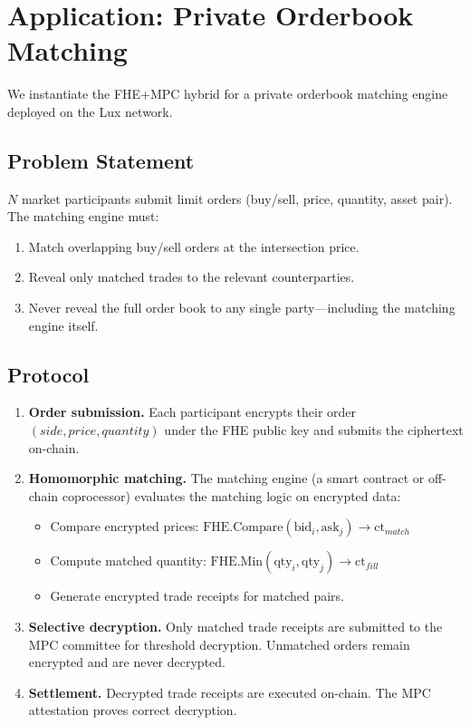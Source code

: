 \section{Application: Private Orderbook Matching}


We instantiate the FHE+MPC hybrid for a private orderbook matching engine deployed on the Lux network.

\subsection{Problem Statement}

$N$ market participants submit limit orders (buy/sell, price, quantity, asset pair). The matching engine must:
\begin{enumerate}[leftmargin=2em]
\item Match overlapping buy/sell orders at the intersection price.
\item Reveal only matched trades to the relevant counterparties.
\item Never reveal the full order book to any single party---including the matching engine itself.
\end{enumerate}

\subsection{Protocol}

\begin{enumerate}[leftmargin=2em]
\item \textbf{Order submission.} Each participant encrypts their order $(side, price, quantity)$ under the FHE public key and submits the ciphertext on-chain.
\item \textbf{Homomorphic matching.} The matching engine (a smart contract or off-chain coprocessor) evaluates the matching logic on encrypted data:
    \begin{itemize}
    \item Compare encrypted prices: $\text{FHE.Compare}(\text{bid}_i, \text{ask}_j) \to \text{ct}_{match}$
    \item Compute matched quantity: $\text{FHE.Min}(\text{qty}_i, \text{qty}_j) \to \text{ct}_{fill}$
    \item Generate encrypted trade receipts for matched pairs.
    \end{itemize}
\item \textbf{Selective decryption.} Only matched trade receipts are submitted to the MPC committee for threshold decryption. Unmatched orders remain encrypted and are never decrypted.
\item \textbf{Settlement.} Decrypted trade receipts are executed on-chain. The MPC attestation proves correct decryption.
\end{enumerate}

